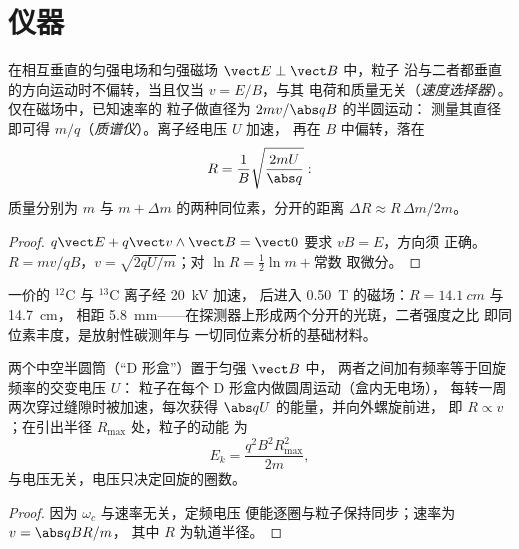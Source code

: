 \section{仪器}

\begin{proposition}[速度选择器与质谱仪]\label{prop:b1:charged-particles:spectrometer}
在相互垂直的匀强电场和匀强磁场 $\vect E \perp \vect B$ 中，粒子
沿与二者都垂直的方向运动时不偏转，当且仅当 $v = E/B$，与其
电荷和质量无关（\emph{速度选择器}）。仅在磁场中，已知速率的
粒子做直径为 $2mv/\abs qB$ 的半圆运动：
测量其直径即可得 $m/q$（\emph{质谱仪}）。离子经电压 $U$ 加速，
再在 $B$ 中偏转，落在
\[
R = \frac{1}{B}\sqrt{\frac{2mU}{\abs q}} :
\]
质量分别为 $m$ 与 $m + \Delta m$ 的两种同位素，分开的距离 $\Delta R \approx
R\,\Delta m/2m$。
\end{proposition}

\begin{proof}
$q\vect E + q\vect v\wedge\vect B = \vect 0$ 要求 $vB = E$，方向须
正确。$R = mv/qB$，$v = \sqrt{2qU/m}$；对
$\ln R = \tfrac12\ln m + \text{常数}$ 取微分。
\end{proof}

\begin{example}[碳同位素]\label{ex:b1:charged-particles:isotopes}
一价的 $^{12}$C 与 $^{13}$C 离子经 \qty{20}{kV} 加速，
后进入 \qty{0.50}{T} 的磁场：$R = \qty{14.1}{cm}$ 与 \qty{14.7}{cm}，
相距 \qty{5.8}{mm}——在探测器上形成两个分开的光斑，二者强度之比
即同位素丰度，是放射性碳测年与
一切同位素分析的基础材料。
\end{example}

\begin{proposition}[回旋加速器]\label{prop:b1:charged-particles:cyclotron}
两个中空半圆筒（“D 形盒”）置于匀强 $\vect B$ 中，
两者之间加有频率等于回旋频率的交变电压 $U$：
粒子在每个 D 形盒内做圆周运动（盒内无电场），
每转一周两次穿过缝隙时被加速，每次获得 $\abs qU$ 的能量，并向外螺旋前进，
即 $R \propto v$；在引出半径 $R_{\max}$ 处，粒子的动能
为
\[
E_k = \frac{q^2B^2R_{\max}^2}{2m},
\]
与电压无关，电压只决定回旋的圈数。
\end{proposition}

\begin{proof}
 因为 $\omega_c$ 与速率无关，定频电压
 便能逐圈与粒子保持同步；速率为 $v = \abs qBR/m$，
 其中 $R$ 为轨道半径。
\end{proof}

